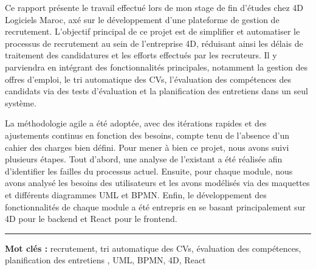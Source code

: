 \begin{spacing}{1.25}

Ce rapport présente le travail effectué lors de mon stage de fin d’études 
chez 4D Logiciels Maroc, axé sur le développement 
d’une plateforme de gestion de recrutement. L'objectif principal 
de ce projet est de simplifier et automatiser le processus de recrutement au sein de l'entreprise 4D,
réduisant ainsi les délais de traitement des candidatures et les efforts effectués par les recruteurs. 
Il y parviendra en intégrant des fonctionnalités principales, notamment la 
gestion des offres d'emploi, le tri automatique des CVs, l'évaluation des compétences des candidats via des tests d'évaluation 
et la planification des entretiens dans un seul système.
\newline

La méthodologie agile a été adoptée, avec des itérations rapides et des ajustements continus en fonction des besoins, 
compte tenu de l'absence d'un cahier des charges bien défini. Pour mener à bien ce projet, nous avons suivi plusieurs étapes. 
Tout d’abord, une analyse de l'existant a été réalisée afin d'identifier les failles du processus actuel. Ensuite, pour chaque module, 
nous avons analysé les besoins des utilisateurs et les avons modélisés via des maquettes et différents diagrammes UML et BPMN. Enfin, le développement 
des fonctionnalités de chaque module a été entrepris en se basant principalement sur 4D pour le backend et React pour le frontend.


\end{spacing}

\vspace{1cm}
\noindent\rule[2pt]{\textwidth}{0.5pt}

{\textbf{Mot clés :} 
recrutement,
tri automatique des CVs,
évaluation des compétences, planification des entretiens
, UML, BPMN, 4D, React}
\\
